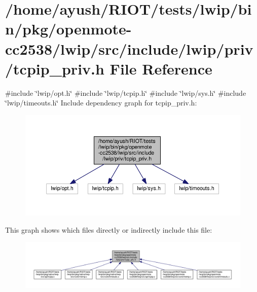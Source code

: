 \hypertarget{openmote-cc2538_2lwip_2src_2include_2lwip_2priv_2tcpip__priv_8h}{}\section{/home/ayush/\+R\+I\+O\+T/tests/lwip/bin/pkg/openmote-\/cc2538/lwip/src/include/lwip/priv/tcpip\+\_\+priv.h File Reference}
\label{openmote-cc2538_2lwip_2src_2include_2lwip_2priv_2tcpip__priv_8h}
{\ttfamily \#include \char`\"{}lwip/opt.\+h\char`\"{}}\newline
{\ttfamily \#include \char`\"{}lwip/tcpip.\+h\char`\"{}}\newline
{\ttfamily \#include \char`\"{}lwip/sys.\+h\char`\"{}}\newline
{\ttfamily \#include \char`\"{}lwip/timeouts.\+h\char`\"{}}\newline
Include dependency graph for tcpip\+\_\+priv.\+h\+:
\nopagebreak
\begin{figure}[H]
\begin{center}
\leavevmode
\includegraphics[width=350pt]{openmote-cc2538_2lwip_2src_2include_2lwip_2priv_2tcpip__priv_8h__incl}
\end{center}
\end{figure}
This graph shows which files directly or indirectly include this file\+:
\nopagebreak
\begin{figure}[H]
\begin{center}
\leavevmode
\includegraphics[width=350pt]{openmote-cc2538_2lwip_2src_2include_2lwip_2priv_2tcpip__priv_8h__dep__incl}
\end{center}
\end{figure}
